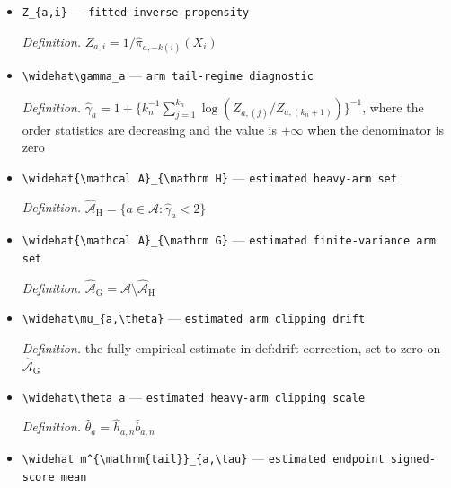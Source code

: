 \documentclass{article}
\begin{document}
\begin{itemize}
  \item \texttt{Z\_\allowbreak{}\{a,\allowbreak{}i\}\allowbreak{}} --- \texttt{fitted inverse propensity}
  \par\smallskip\noindent\emph{Definition.} \(Z_{a,i}=1/\widehat\pi_{a,-k(i)}(X_i)\)
  \item \texttt{\textbackslash{}\allowbreak{}widehat\textbackslash{}\allowbreak{}gamma\_\allowbreak{}a} --- \texttt{arm tail-\allowbreak{}regime diagnostic}
  \par\smallskip\noindent\emph{Definition.} \(\widehat\gamma_a=1+\{k_n^{-1}\sum_{j=1}^{k_n}\log(Z_{a,(j)}/Z_{a,(k_n+1)})\}^{-1}\), where the order statistics are decreasing and the value is \(+\infty\) when the denominator is zero
  \item \texttt{\textbackslash{}\allowbreak{}widehat\{\textbackslash{}\allowbreak{}mathcal A\}\allowbreak{}\_\allowbreak{}\{\textbackslash{}\allowbreak{}mathrm H\}\allowbreak{}} --- \texttt{estimated heavy-\allowbreak{}arm set}
  \par\smallskip\noindent\emph{Definition.} \(\widehat{\mathcal A}_{\mathrm H}=\{a\in\mathcal A:\widehat\gamma_a<2\}\)
  \item \texttt{\textbackslash{}\allowbreak{}widehat\{\textbackslash{}\allowbreak{}mathcal A\}\allowbreak{}\_\allowbreak{}\{\textbackslash{}\allowbreak{}mathrm G\}\allowbreak{}} --- \texttt{estimated finite-\allowbreak{}variance arm set}
  \par\smallskip\noindent\emph{Definition.} \(\widehat{\mathcal A}_{\mathrm G}=\mathcal A\setminus\widehat{\mathcal A}_{\mathrm H}\)
  \item \texttt{\textbackslash{}\allowbreak{}widehat\textbackslash{}\allowbreak{}mu\_\allowbreak{}\{a,\allowbreak{}\textbackslash{}\allowbreak{}theta\}\allowbreak{}} --- \texttt{estimated arm clipping drift}
  \par\smallskip\noindent\emph{Definition.} the fully empirical estimate in \(\text{def:drift-correction}\), set to zero on \(\widehat{\mathcal A}_{\mathrm G}\)
  \item \texttt{\textbackslash{}\allowbreak{}widehat\textbackslash{}\allowbreak{}theta\_\allowbreak{}a} --- \texttt{estimated heavy-\allowbreak{}arm clipping scale}
  \par\smallskip\noindent\emph{Definition.} \(\widehat\theta_a=\widehat h_{a,n}\widehat b_{a,n}\)
  \item \texttt{\textbackslash{}\allowbreak{}widehat m\textasciicircum{}\{\textbackslash{}\allowbreak{}mathrm\{tail\}\allowbreak{}\}\allowbreak{}\_\allowbreak{}\{a,\allowbreak{}\textbackslash{}\allowbreak{}tau\}\allowbreak{}} --- \texttt{estimated endpoint signed-\allowbreak{}score mean}

\end{itemize}
\end{document}
